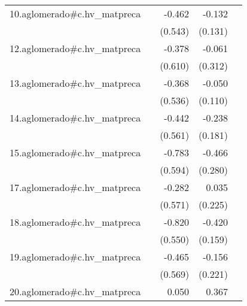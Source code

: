 {\begin{longtable}{l*{4}{D{.}{.}{-1}}}
\addlinespace
10.aglomerado#c.hv\_matpreca&                     &      -0.462         &      -0.132         &                     \\
            &                     &     (0.543)         &     (0.131)         &                     \\
\addlinespace
12.aglomerado#c.hv\_matpreca&                     &      -0.378         &      -0.061         &                     \\
            &                     &     (0.610)         &     (0.312)         &                     \\
\addlinespace
13.aglomerado#c.hv\_matpreca&                     &      -0.368         &      -0.050         &                     \\
            &                     &     (0.536)         &     (0.110)         &                     \\
\addlinespace
14.aglomerado#c.hv\_matpreca&                     &      -0.442         &      -0.238         &                     \\
            &                     &     (0.561)         &     (0.181)         &                     \\
\addlinespace
15.aglomerado#c.hv\_matpreca&                     &      -0.783         &      -0.466         &                     \\
            &                     &     (0.594)         &     (0.280)         &                     \\
\addlinespace
17.aglomerado#c.hv\_matpreca&                     &      -0.282         &       0.035         &                     \\
            &                     &     (0.571)         &     (0.225)         &                     \\
\addlinespace
18.aglomerado#c.hv\_matpreca&                     &      -0.820         &      -0.420\sym{**} &                     \\
            &                     &     (0.550)         &     (0.159)         &                     \\
\addlinespace
19.aglomerado#c.hv\_matpreca&                     &      -0.465         &      -0.156         &                     \\
            &                     &     (0.569)         &     (0.221)         &                     \\
\addlinespace
20.aglomerado#c.hv\_matpreca&                     &       0.050         &       0.367         &                     \\

\end{longtable}}

